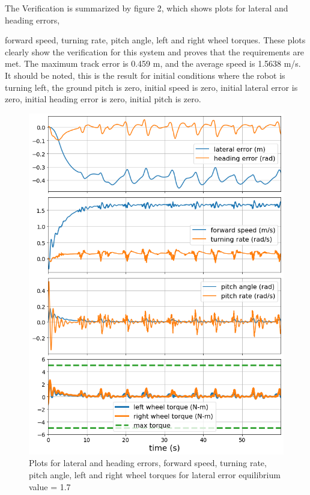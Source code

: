 \documentclass[10pt, letterbox]{article}
\begin{document}
\begin{addmargin}[5em]{0em}
The Verification is summarized by figure 2, which shows plots for lateral and heading errors,\end{addmargin} forward speed, turning rate, pitch angle, left and right wheel torques.
These plots clearly show the verification for this system and proves that the requirements are met. The maximum track error is 0.459 m, and the average speed is 1.5638 m/s. It should be noted, this is the result for initial conditions where the robot is turning left, the ground pitch is zero, initial speed is zero, initial lateral error is zero, initial heading error is zero, initial pitch is zero. 
\begin{figure}[h]
    \begin{center}
    \includegraphics[scale=0.4]{ae353dp2plots}
    \caption{Plots for lateral and heading errors, forward speed, turning rate, pitch angle, left and right wheel torques for lateral error equilibrium value = 1.7}
    \label{fig:fig2}
    \end{center}
\end{figure}
\end{document}
